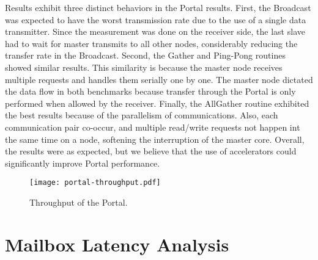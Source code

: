 		Results exhibit three distinct behaviors in the Portal results. First,
		the Broadcast was expected to have the worst transmission rate due to
		the use of a single data transmitter. Since the measurement was done
		on the receiver side, the last slave had to wait for master transmits
		to all other nodes, considerably reducing the transfer rate in the
		Broadcast. Second, the Gather and Ping-Pong routines showed similar
		results. This similarity is because the master node receives multiple
		requests and handles them serially one by one. The master node
		dictated the data flow in both benchmarks because transfer through
		the Portal is only performed when allowed by the receiver. Finally,
		the AllGather routine exhibited the best results because of the
		parallelism of communications. Also, each communication pair co-occur,
		and multiple read/write requests not happen int the same time on a node,
		softening the interruption of the master core. Overall, the results
		were as expected, but we believe that the use of \dma accelerators could
		significantly improve Portal performance.

		\begin{figure}[!tb]
			\centering%
			\caption{Throughput of the Portal.}%
			\label{fig:exp-portal}%
			\texttt{[image: portal-throughput.pdf]}%
		\end{figure}

	\section{Mailbox Latency Analysis}



